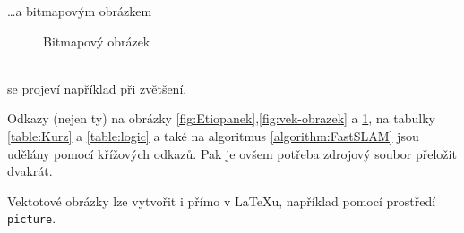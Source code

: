 \documentclass[a4paper,11pt]{article}
\begin{document}
    \dots a bitmapovým obrázkem \\
    \begin{figure}[h]
        \centering
        \caption{Bitmapový obrázek}
        \label{fig:bit-obrazek}
    \end{figure}\\
    se projeví například při zvětšení. 
    
    Odkazy (nejen ty) na obrázky \ref{fig:Etiopanek},\ref{fig:vek-obrazek} a \ref{fig:bit-obrazek}, na tabulky \ref{table:Kurz} a \ref{table:logic} a také na algoritmus \ref{algorithm:FastSLAM} jsou udělány pomocí křížových odkazů. Pak je ovšem potřeba zdrojový soubor přeložit dvakrát.
    
    Vektotové obrázky lze vytvořit i přímo v \LaTeX u, například pomocí prostředí \verb|picture|.
    
\end{document}
